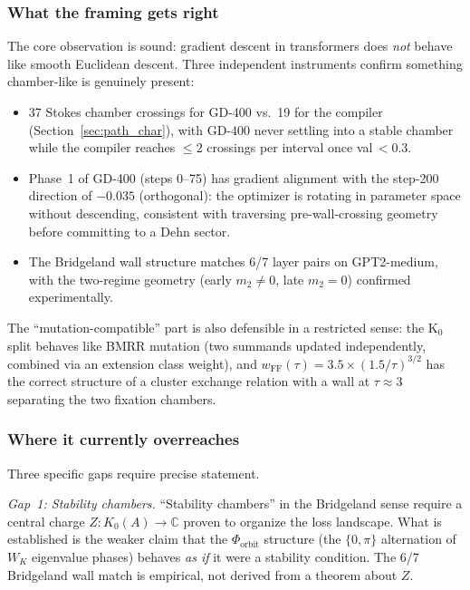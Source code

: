 \documentclass[11pt]{amsart}
\begin{document}
\subsubsection*{What the framing gets right}

The core observation is sound: gradient descent in transformers does
\emph{not} behave like smooth Euclidean descent.
Three independent instruments confirm something chamber-like is
genuinely present:
\begin{itemize}
\item 37 Stokes chamber crossings for GD-400 vs.\ 19 for the compiler
  (Section~\ref{sec:path_char}), with GD-400 never settling into a
  stable chamber while the compiler reaches $\leq 2$ crossings per
  interval once val\,$< 0.3$.
\item Phase~1 of GD-400 (steps 0--75) has gradient alignment with
  the step-200 direction of $-0.035$ (orthogonal): the optimizer is
  rotating in parameter space without descending, consistent with
  traversing pre-wall-crossing geometry before committing to a
  Dehn sector.
\item The Bridgeland wall structure matches 6/7 layer pairs on
  GPT2-medium, with the two-regime geometry (early $m_2 \neq 0$,
  late $m_2 = 0$) confirmed experimentally.
\end{itemize}

The ``mutation-compatible'' part is also defensible in a restricted
sense: the K$_0$ split behaves like BMRR mutation (two summands
updated independently, combined via an extension class weight),
and $w_\mathrm{FF}(\tau) = 3.5 \times (1.5/\tau)^{3/2}$ has the
correct structure of a cluster exchange relation with a wall at
$\tau \approx 3$ separating the two fixation chambers.

\subsubsection*{Where it currently overreaches}

Three specific gaps require precise statement.

\emph{Gap~1: Stability chambers.}
``Stability chambers'' in the Bridgeland sense require a central
charge $Z: K_0(A) \to \mathbb{C}$ proven to organize the loss
landscape.
What is established is the weaker claim that the $\Phi_\mathrm{orbit}$
structure (the $\{0,\pi\}$ alternation of $W_K$ eigenvalue phases)
behaves \emph{as if} it were a stability condition.
The 6/7 Bridgeland wall match is empirical, not derived from a theorem
about $Z$.
\end{document}
